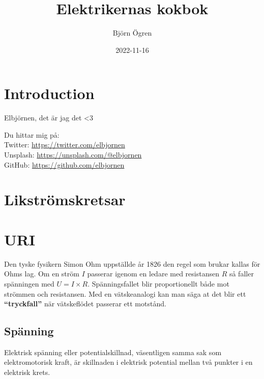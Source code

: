 \documentclass[
]{book}
\title{Elektrikernas kokbok}
\author{Björn Ögren}
\date{2022-11-16}
\begin{document}
\maketitle

{
\setcounter{tocdepth}{1}
\tableofcontents
}
\hypertarget{introduction}{%
\chapter*{Introduction}\label{introduction}}

Elbjörnen, det är jag det \textless3

Du hittar mig på:\\
Twitter: \url{https://twitter.com/elbjornen}\\
Unsplash: \url{https://unsplash.com/@elbjornen}\\
GitHub: \url{https://github.com/elbjornen}

\hypertarget{likstruxf6mskretsar}{%
\chapter*{Likströmskretsar}\label{likstruxf6mskretsar}}

\hypertarget{uri}{%
\chapter{URI}\label{uri}}

Den tyske fysikern Simon Ohm uppställde år 1826 den regel som brukar kallas för Ohms lag. Om en ström \(I\) passerar igenom en ledare med resistansen \(R\) så faller spänningen med \(U = I×R\). Spänningsfallet blir proportionellt både mot strömmen och resistansen. Med en vätskeanalogi kan man säga at det blir ett \textbf{``tryckfall''} när vätskeflödet passerar ett motstånd.

\hypertarget{spuxe4nning}{%
\section{Spänning}\label{spuxe4nning}}

Elektrisk spänning eller potentialskillnad, väsentligen samma sak som elektromotorisk kraft, är skillnaden i elektrisk potential mellan två punkter i en elektrisk krets.
\end{document}
